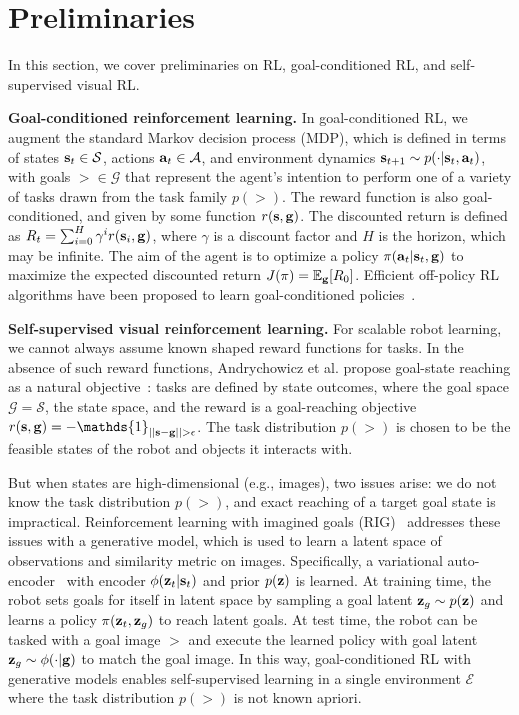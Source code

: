 \documentclass[letterpaper, 10 pt, conference]{ieeeconf}  %
\begin{document}
\section{Preliminaries}
\label{sec:background}

In this section, we cover preliminaries on RL, goal-conditioned RL, and self-supervised visual RL.

\noindent \textbf{Goal-conditioned reinforcement learning.}
In goal-conditioned RL, we augment the standard Markov decision process (MDP), which is defined in terms of states $\mathbf{s}_t \in \mathcal{S}$, actions $\mathbf{a}_t \in \mathcal{A}$, and environment dynamics \mbox{$\mathbf{s}_{t+1} \sim p(\cdot|\mathbf{s}_t, \mathbf{a}_t)$}, with goals $\gt \in \mathcal{G}$ that represent the agent's intention to perform one of a variety of tasks drawn from the task family $p(\gt)$. The reward function is also goal-conditioned, and given by some function $r(\mathbf{s}, \mathbf{g})$. The discounted return is defined as $R_t = \sum_{i=0}^H \gamma^i r(\mathbf{s}_i, \mathbf{g})$, where $\gamma$ is a discount factor and $H$ is the horizon, which may be infinite. The aim of the agent is to optimize a policy $\pi(\mathbf{a}_t|\mathbf{s}_t, \mathbf{g})$ to maximize the expected discounted return $J(\pi) = \mathbb{E}_{\mathbf{g}}[R_0]$.
Efficient off-policy RL algorithms have been proposed to learn goal-conditioned policies~\cite{schaul2015uva, andrychowicz2017her}.

\noindent \textbf{Self-supervised visual reinforcement learning.}
For scalable robot learning, we cannot always assume known shaped reward functions for tasks. In the absence of such reward functions, Andrychowicz et al. propose goal-state reaching as a natural objective~\cite{andrychowicz2017her}:
tasks are defined by state outcomes, where the goal space $\mathcal{G} = \mathcal{S}$, the state space, and the reward is a goal-reaching objective $r(\st, \gt) = -\mathds{1}_{||\st - \gt|| > \epsilon}$.
The task distribution $p(\gt)$ is chosen to be the feasible states of the robot and objects it interacts with.

But when states are high-dimensional (e.g., images), two issues arise: we do not know the task distribution $p(\gt)$, and exact reaching of a target goal state is impractical.
Reinforcement learning with imagined goals (RIG)~\cite{nair2018rig} addresses these issues with a generative model, which is used to learn a latent space of observations and similarity metric on images. 
Specifically, a variational auto-encoder~\cite{kingma2014vae} with encoder $\phi(\mathbf{z}_t|\mathbf{s}_t)$ and prior $p(\mathbf{z})$ is learned. 
At training time, the robot sets goals for itself in latent space by sampling a goal latent $\mathbf{z}_g \sim p(\mathbf{z})$ and learns a policy $\pi(\mathbf{z}_t, \mathbf{z}_g)$ to reach latent goals. 
At test time, the robot can be tasked with a goal image $\gt$ and execute the learned policy with goal latent $\mathbf{z}_g \sim \phi(\cdot|\mathbf{g})$ to match the goal image.
In this way, goal-conditioned RL with generative models enables self-supervised learning in a single environment $\mathcal{E}$ where the task distribution $p(\gt)$ is not known apriori.
\end{document}
